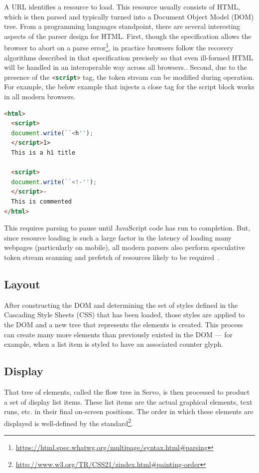 A URL identifies a resource to load.
This resource usually consists of HTML, which is then parsed and typically turned into a Document Object
Model (DOM) tree.
From a programming languages standpoint, there are several interesting aspects of the parser design
for HTML.
First, though the specification allows the browser to abort on a parse error\footnote{\url{https://html.spec.whatwg.org/multipage/syntax.html#parsing}},
in practice browsers follow the recovery algorithms described in that specification precisely so that
even ill-formed HTML will be handled in an interoperable way across all browsers..
Second, due to the presence of the \lstinline[language=HTML]{<script>} tag, the token stream can be modified
during operation.
For example, the below example that injects a close tag for the script block works in all modern browsers.
\begin{lstlisting}[language=HTML]
<html>
  <script>
  document.write(``<h'');
  </script>1>
  This is a h1 title

  <script>
  document.write(``<!-'');
  </script>-
  This is commented
</html>
\end{lstlisting}
This requires parsing to pause until JavaScript code has run to completion.
But, since resource loading is such a large factor in the latency of loading many webpages (particularly on mobile),
all modern parsers also perform speculative token stream scanning and prefetch of resources likely to be required~\cite{browsers-slow-smartphones}.

\subsection{Layout}

After constructing the DOM and determining the set of styles defined in the Cascading Style Sheets (CSS) that has
been loaded, those styles are applied to the DOM and a new tree that represents the elements is created.
This process can create many more elements than previously existed in the DOM --- for example, when a list item is
styled to have an associated counter glyph.

\subsection{Display}

That tree of elements, called the flow tree in Servo, is then processed to product a set of display list items.
These list items are the actual graphical elements, text runs, etc. in their final on-screen positions.
The order in which these elements are displayed is well-defined by the standard\footnote{\url{http://www.w3.org/TR/CSS21/zindex.html#painting-order}}.


